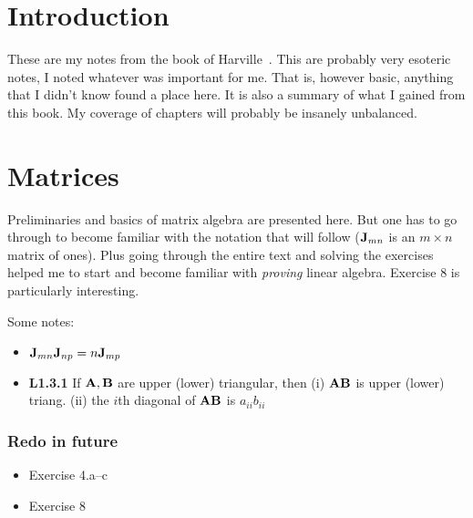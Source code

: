 \documentclass[a4paper, oneside]{book}
\begin{document}
\chapter*{Introduction}

These are my notes from the book of Harville~\cite{harville97}. This are probably very esoteric notes, I noted whatever was important for me. That is, however basic, anything that I didn't know found a place here. It is also a summary of what I gained from this book. My coverage of chapters will probably be insanely unbalanced.

\chapter{Matrices}
Preliminaries and basics of matrix algebra are presented here. But one has to go through to become familiar with the notation that will follow (\eg $\mathbf{J}_{mn}$ is an $m\times n$ matrix of ones). Plus going through the entire text and solving the exercises helped me to start and become familiar with \textit{proving} linear algebra. Exercise 8 is particularly interesting.

Some notes:

\begin{itemize}
\item $\mathbf{J}_{mn} \mathbf{J}_{np} = n \mathbf{J}_{mp}$ 
\item \textbf{L1.3.1} If $\mathbf{A,B}$ are upper (lower) triangular, then (i) $\mathbf{AB}$ is upper (lower) triang. (ii) the $i$th diagonal of $\mathbf{AB}$ is $a_{ii} b_{ii}$
\end{itemize}

\subsection{Redo in future}
\begin{itemize}
\item Exercise 4.a--c
\item Exercise 8
\end{itemize}










\end{document}
